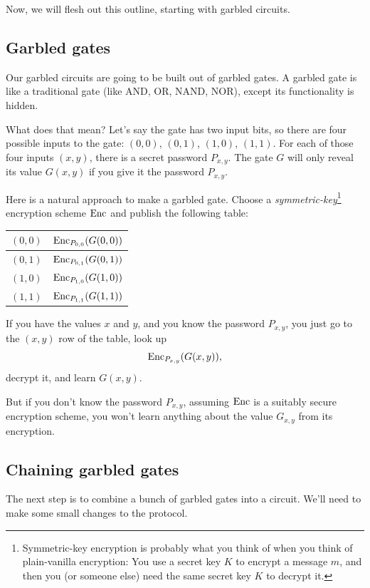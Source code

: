 Now, we will flesh out this outline, starting with garbled circuits.

\subsection{Garbled gates}
Our garbled circuits are going to be built out of \alert{garbled gates}.
A garbled gate is like a traditional gate (like AND, OR, NAND, NOR),
except its functionality is hidden.

What does that mean? Let's say the gate has two input bits, so there
are four possible inputs to the gate: $(0,0)$, $(0,1)$, $(1,0)$, $(1,1)$.
For each of those four inputs $(x,y)$,
there is a secret password $P_{x,y}$.
The gate $G$ will only reveal its value $G(x,y)$ if you
give it the password $P_{x,y}$.

Here is a natural approach to make a garbled gate. Choose a
\emph{symmetric-key}\footnote{Symmetric-key encryption is probably what
  you think of when you think of plain-vanilla encryption: You use a
  secret key $K$ to encrypt a message $m$, and then you (or someone
  else) need the same secret key $K$ to decrypt it.} encryption scheme
$\operatorname{Enc}$ and publish the following table:

\begin{center}
\begin{tabular}{|c|c|}
\hline
$(0,0)$ & $\operatorname{Enc}_{P_{0,0}}( G(0,0))$ \\
\hline
$(0,1)$ & $\operatorname{Enc}_{P_{0,1}}( G(0,1))$ \\
\hline
$(1,0)$ & $\operatorname{Enc}_{P_{1,0}}( G(1,0) )$ \\
\hline
$(1,1)$ & $\operatorname{Enc}_{P_{1,1}}( G(1,1))$ \\
\hline
\end{tabular}
\end{center}

If you have the values $x$ and $y$, and you know the password
$P_{x,y}$, you just go to the $(x,y)$ row of the table, look up
\[\operatorname{Enc}_{P_{x,y}} ( G(x,y) ),\] decrypt it, and
learn $G(x,y)$.

But if you don't know the password $P_{x,y}$, assuming
$\operatorname{Enc}$ is a suitably secure encryption scheme, you won't
learn anything about the value $G_{x,y}$ from its encryption.

\subsection{Chaining garbled gates}

The next step is to combine a bunch of garbled gates into a circuit. We'll need to make some small changes to the protocol.

